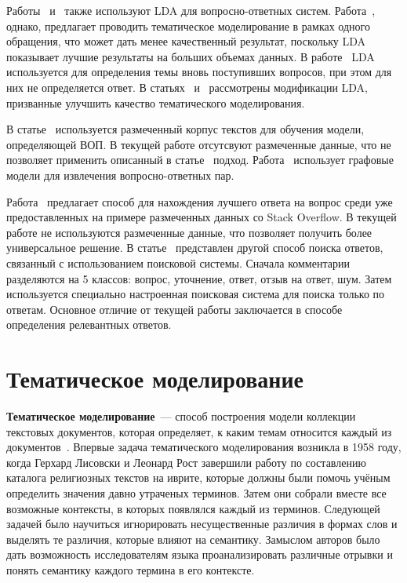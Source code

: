 Работы~\cite{LDA1} и~\cite{LDA2} также используют LDA для вопросно-ответных систем. Работа~\cite{LDA1}, однако, предлагает проводить тематическое моделирование в рамках одного обращения, что может дать менее качественный результат, поскольку LDA показывает лучшие результаты на больших объемах данных. В работе~\cite{LDA2} LDA используется для определения темы вновь поступивших вопросов, при этом для них не определяется ответ. В статьях~\cite{TMuse} и~\cite{2016lda} рассмотрены модификации LDA, призванные улучшить качество тематического моделирования.

В статье~\cite{ML1} используется размеченный корпус текстов для обучения модели, определяющей ВОП. В текущей работе отсутсвуют размеченные данные, что не позволяет применить описанный в статье~\cite{ML1} подход. Работа~\cite{ML2} использует графовые модели для извлечения вопросно-ответных пар.

Работа~\cite{so} предлагает способ для нахождения лучшего ответа  на вопрос среди уже предоставленных на примере размеченных данных со Stack Overflow. В текущей работе не используются размеченные данные, что позволяет получить более универсальное решение. В статье~\cite{engine} представлен другой способ поиска ответов, связанный с использованием поисковой системы. Сначала комментарии разделяются на 5 классов: вопрос, уточнение, ответ, отзыв на ответ, шум. Затем используется специально настроенная поисковая система для поиска только по ответам. Основное отличие от текущей работы заключается в способе определения релевантных ответов.

\section{Тематическое моделирование}
\label{sec:overview_tm}

\textbf{Тематическое моделирование}~--- способ построения модели коллекции текстовых документов, которая определяет, к каким темам относится каждый из документов~\cite{TM}. Впервые задача тематического моделирования возникла в 1958 году, когда Герхард Лисовски и Леонард Рост завершили работу по составлению каталога религиозных текстов на иврите, которые должны были помочь учёным определить значения давно утраченых терминов. Затем они собрали вместе все возможные контексты, в которых появлялся каждый из терминов. Следующей задачей было научиться игнорировать несущественные различия в формах слов и выделять те различия, которые влияют на семантику. Замыслом авторов было дать возможность исследователям языка проанализировать различные отрывки и понять семантику каждого термина в его контексте. 

